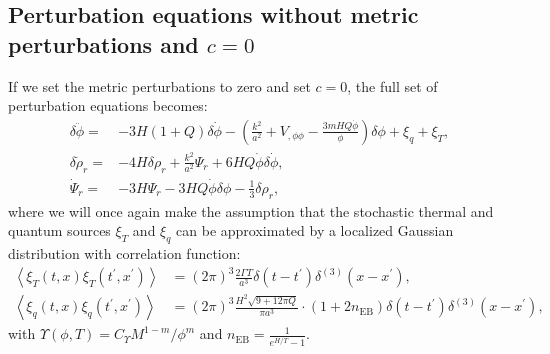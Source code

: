 \subsection{Perturbation equations without metric perturbations and $c=0$}
If we set the metric perturbations to zero and set $c=0$, the full set of perturbation equations becomes:
\begin{align}
\delta \ddot{\phi}=&-3 H(1+Q) \delta \dot{\phi}-\left(\frac{k^2}{a^2}+V_{, \phi \phi}-\frac{3m H Q \dot{\phi}}{\phi}\right) \delta \phi +\xi_q+\xi_T , \label{eq2:Gab1} \\ \delta \dot{\rho}_r=&-4H \delta \rho_r+\frac{k^2}{a^2} \Psi_r+6 H Q \dot{\phi} \delta\dot{\phi}, \label{eq2:Gab2}\\ 
\dot{\Psi}_r=&-3 H \Psi_r-3 H Q \dot{\phi} \delta \phi-\frac{1}{3} \delta \rho_r, \label{eq2:Gab3}
 \end{align}
where we will once again make the assumption that the stochastic thermal and quantum sources $\xi_T$ and $\xi_q$ can be approximated by a localized Gaussian distribution with correlation function:
\begin{align}
    \left\langle\xi_T(t, x) \xi_T\left(t^{\prime}, x^{\prime}\right)\right\rangle&=(2\pi)^3\frac{2\Gamma T}{ a^3}\delta\left(t-t^{\prime}\right) \delta^{(3)}\left(x-x^{\prime}\right), \label{eq:noiseT}\\
    \left\langle\xi_q(t, x) \xi_q\left(t^{\prime}, x^{\prime}\right)\right\rangle&=(2\pi)^3\frac{H^2\sqrt{9+12\pi Q}}{ \pi a^3}\cdot(1+2n_{\mathrm{EB}})\delta\left(t-t^{\prime}\right) \delta^{(3)}\left(x-x^{\prime}\right),  \label{eq:noiseQ}  
\end{align}
with $\Upsilon(\phi, T)=C_{\Upsilon} M^{1-m}/ \phi^m$ and $n_{\mathrm{EB}}=\frac{1}{e^{H/T}-1}$.


